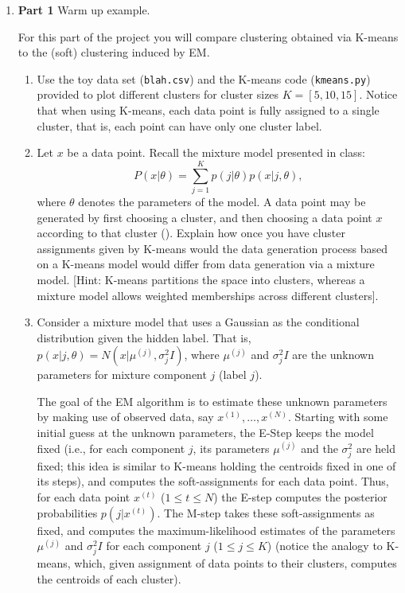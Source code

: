 \begin{enumerate}

\item {\bf Part 1} Warm up example.

For this part of the project you will compare clustering obtained via K-means to the (soft) clustering induced by EM.

\begin{enumerate}
  \item Use the toy data set (\texttt{blah.csv}) and the K-means code (\texttt{kmeans.py}) provided to plot different clusters for cluster sizes $K = [5, 10, 15]$. Notice that when using K-means, each data point is fully assigned to a single cluster, that is, each point can have only one cluster label.
  \item Let $x$ be a data point. Recall the mixture model presented in class: $$P(x | \theta) = \sum^{K}_{j=1} p(j| \theta)p(x | j, \theta),$$ where $\theta$ denotes the parameters of the model. A data point may be generated by first choosing a cluster, and then choosing a data point $x$ according to that cluster (). Explain how once you have cluster assignments given by K-means would the data generation process based on a K-means model would differ from data generation via a mixture model. [Hint: K-means partitions the space into clusters, whereas a mixture model allows weighted memberships across different clusters].
  \item Consider a mixture model that uses a Gaussian as the conditional distribution given the hidden label. That is, $p(x | j, \theta) = N(x | \mu^{(j)}, \sigma^2_{j} I)$, where $\mu^{(j)}$ and $\sigma^2_jI$ are the unknown parameters for mixture component $j$ (label $j$). 

    The goal of the EM algorithm is to estimate these unknown parameters by making use of observed data, say $x^{(1)},\ldots, x^{(N)}$. Starting with some initial guess at the unknown parameters, the E-Step keeps the model fixed (i.e., for each component $j$, its parameters $\mu^{(j)}$ and the $\sigma^2_{j}$ are held fixed; this idea is similar to K-means holding the centroids fixed in one of its steps), and computes the soft-assignments for each data point. Thus, for each data point $x^{(t)}$ ($1 \le t \le N$) the E-step computes the posterior probabilities $p(j | x^{(t)})$. The M-step takes these soft-assignments as fixed, and computes the maximum-likelihood estimates of the parameters $\mu^{(j)}$ and $\sigma_j^2I$ for each component $j$ ($1 \le j \le K$) (notice the analogy to K-means, which, given assignment of data points to their clusters, computes the centroids of each cluster).


\end{enumerate}
\end{enumerate}
